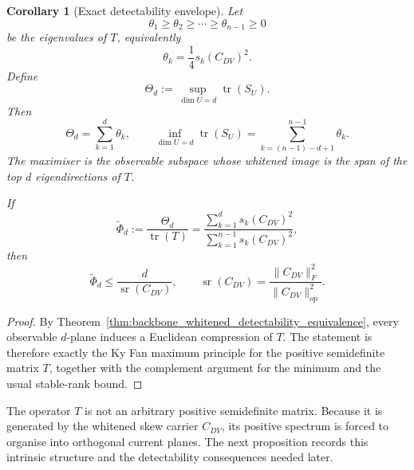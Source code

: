\documentclass[11pt,a4paper]{article}
\numberwithin{equation}{section}
\theoremstyle{thmcompact}
\newtheorem{corollary}[theorem]{Corollary}
\theoremstyle{remark}
\begin{document}
\begin{corollary}[Exact detectability envelope]
\label{cor:exact_detectability_envelope}
Let
\begin{equation}
\theta_1\ge \theta_2\ge \cdots \ge \theta_{n-1}\ge 0
\end{equation}
be the eigenvalues of \(T\), equivalently
\begin{equation}
\theta_k=\frac14 s_k(C_{DV})^2.
\end{equation}
Define
\begin{equation}
\Theta_d:=\sup_{\dim U=d}\operatorname{tr}(S_U).
\end{equation}
Then
\begin{equation}
\Theta_d=\sum_{k=1}^{d}\theta_k,
\qquad
\inf_{\dim U=d}\operatorname{tr}(S_U)=\sum_{k=(n-1)-d+1}^{n-1}\theta_k.
\end{equation}
The maximiser is the observable subspace whose whitened image is the span of the top \(d\) eigendirections of \(T\).

If
\begin{equation}
\widetilde\Phi_d:=\frac{\Theta_d}{\operatorname{tr}(T)}=
\frac{\sum_{k=1}^{d}s_k(C_{DV})^2}{\sum_{k=1}^{n-1}s_k(C_{DV})^2},
\end{equation}
then
\begin{equation}
\widetilde\Phi_d\le \frac{d}{\operatorname{sr}(C_{DV})},
\qquad
\operatorname{sr}(C_{DV})=
\frac{\|C_{DV}\|_F^2}{\|C_{DV}\|_{op}^2}.
\end{equation}
\end{corollary}

\begin{proof}
By Theorem~\ref{thm:backbone_whitened_detectability_equivalence}, every observable \(d\)-plane induces a Euclidean compression of \(T\). The statement is therefore exactly the Ky Fan maximum principle for the positive semidefinite matrix \(T\), together with the complement argument for the minimum and the usual stable-rank bound.
\end{proof}

The operator \(T\) is not an arbitrary positive semidefinite matrix. Because it is generated by the whitened skew carrier \(C_{DV}\), its positive spectrum is forced to organise into orthogonal current planes. The next proposition records this intrinsic structure and the detectability consequences needed later.
\end{document}
